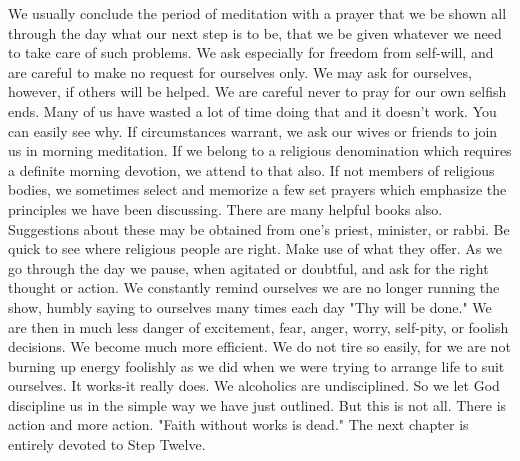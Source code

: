 \begin{biblechapter}
We usually conclude the period of meditation with a prayer that we be shown all through the day what our next step is to be, that we be given whatever we need to take care of such problems.  We ask especially for freedom from self-will, and are careful to make no request for ourselves only.  We may ask for ourselves, however, if others will be helped.  We are careful never to pray for our own selfish ends.  Many of us have wasted a lot of time doing that and it doesn't work.  You can easily see why.
If circumstances warrant, we ask our wives or friends to join us in morning meditation.  If we belong to a religious denomination which requires a definite morning devotion, we attend to that also.  If not members of religious bodies, we sometimes select and memorize a few set prayers which emphasize the principles we have been discussing.  There are many helpful books also.  Suggestions about these may be obtained from one's priest, minister, or rabbi.  Be quick to see where religious people are right.  Make use of what they offer.
As we go through the day we pause, when agitated or doubtful, and ask for the right thought or action.  We constantly remind ourselves we are no longer running the show, humbly saying to ourselves many times each day "Thy will be done."  We are then in much less danger of excitement, fear, anger, worry, self-pity, or foolish decisions.  We become much more efficient.  We do not tire so easily, for we are not burning up energy foolishly as we did when we were trying to arrange life to suit ourselves.
It works-it really does.
We alcoholics are undisciplined.  So we let God discipline us in the simple way we have just outlined.
But this is not all.  There is action and more action.  "Faith without works is dead."  The next chapter is entirely devoted to Step Twelve.

\end{biblechapter}

